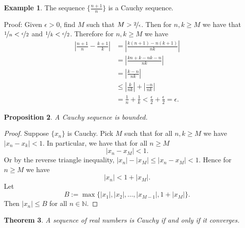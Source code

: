 \documentclass[12pt]{book}
\newcommand{\abs}[1]{\left\lvert {#1} \right\rvert}
\newcommand{\N}{{\mathbb{N}}}
\theoremstyle{plain}
\newtheorem{thm}{Theorem}[section]
\newtheorem{prop}[thm]{Proposition}
\theoremstyle{remark}
\theoremstyle{definition}
\theoremstyle{exercise}
\theoremstyle{example}
\newtheorem{example}[thm]{Example}
\begin{document}
\begin{example}
The sequence $\{ \frac{n+1}{n} \}$ is a Cauchy sequence.

Proof:  Given $\epsilon > 0$, find $M$ such that
$M > \nicefrac{2}{\epsilon}$.  Then for $n,k \geq M$
we have that $\nicefrac{1}{n} < \nicefrac{\epsilon}{2}$
and
$\nicefrac{1}{k} < \nicefrac{\epsilon}{2}$.  Therefore for $n, k \geq M$
we have
\begin{equation*}
\begin{split}
\abs{\frac{n+1}{n} - \frac{k+1}{k}}
& =
\abs{\frac{k(n+1)-n(k+1)}{nk}}
\\
& =
\abs{\frac{kn+k-nk-n}{nk}}
\\
& =
\abs{\frac{k-n}{nk}}
\\
& \leq
\abs{\frac{k}{nk}}
+
\abs{\frac{-n}{nk}}
\\
& = \frac{1}{n} + \frac{1}{k}
< \frac{\epsilon}{2} + \frac{\epsilon}{2} = \epsilon .
\end{split}
\end{equation*}
\end{example}

\begin{prop}
A Cauchy sequence is bounded.
\end{prop}

\begin{proof}
Suppose $\{ x_n \}$ is Cauchy.  Pick $M$ such that for all
$n,k \geq M$ we have $\abs{x_n-x_k} < 1$.  In particular, we have
that for all $n \geq M$
\begin{equation*}
\abs{x_n - x_M} < 1 .
\end{equation*}
Or by the reverse triangle inequality,
$\abs{x_n} - \abs{x_M} \leq \abs{x_n - x_M} < 1$.  Hence for $n \geq M$
we have
\begin{equation*}
\abs{x_n} < 1 + \abs{x_M}.
\end{equation*}
Let
\begin{equation*}
B := \max \{ \abs{x_1}, \abs{x_2}, \ldots, \abs{x_{M-1}}, 1+ \abs{x_M} \} .
\end{equation*}
Then $\abs{x_n} \leq B$ for all $n \in \N$.
\end{proof}

\begin{thm}
A sequence of real numbers is Cauchy if and only if it converges.
\end{thm}
\end{document}
